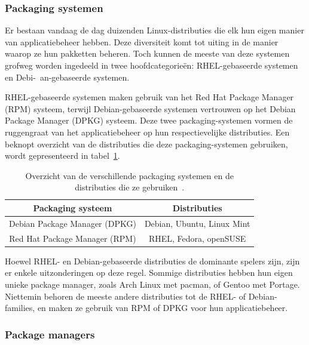 \subsubsection{Packaging systemen}
\label{linux_packaging_systemen}

Er bestaan vandaag de dag duizenden Linux-distributies die elk hun eigen manier van applicatiebeheer hebben.
Deze diversiteit komt tot uiting in de manier waarop ze hun pakketten beheren.
Toch kunnen de meeste van deze systemen grofweg worden ingedeeld in twee hoofdcategorie\"en: RHEL-gebaseerde systemen en Debi-\ an-gebaseerde systemen.

RHEL-gebaseerde systemen maken gebruik van het Red Hat Package Manager (RPM) systeem, terwijl Debian-gebaseerde systemen vertrouwen op het Debian Package Manager (DPKG) systeem.
Deze twee packaging-systemen vormen de ruggengraat van het applicatiebeheer op hun respectievelijke distributies.
Een beknopt overzicht van de distributies die deze packaging-systemen gebruiken, wordt gepresenteerd in tabel~\ref{table:packaging-systems}.

\begin{table}[!h]
    \begin{center}
        \begin{tabular}{ c c  }
            \hline
                Packaging systeem & Distributies\\ [0.5ex] 
            \hline
            Debian Package Manager (DPKG)     & Debian, Ubuntu, Linux Mint \\
            Red Hat Package Manager (RPM)     & RHEL, Fedora, openSUSE \\
        \end{tabular}
    \end{center}
    \caption[Overzicht van packaging systemen.]{Overzicht van de verschillende packaging systemen en de distributies die ze gebruiken~\autocite{shotts2019linux}.}
    \label{table:packaging-systems}
\end{table}

Hoewel RHEL- en Debian-gebaseerde distributies de dominante spelers zijn, zijn er enkele uitzonderingen op deze regel.
Sommige distributies hebben hun eigen unieke package manager, zoals Arch Linux met pacman, of Gentoo met Portage.
Niettemin behoren de meeste andere distributies tot de RHEL- of Debian-families, en maken ze gebruik van RPM of DPKG voor hun applicatiebeheer.

\subsubsection{Package managers}
\label{linux_package_managers}

